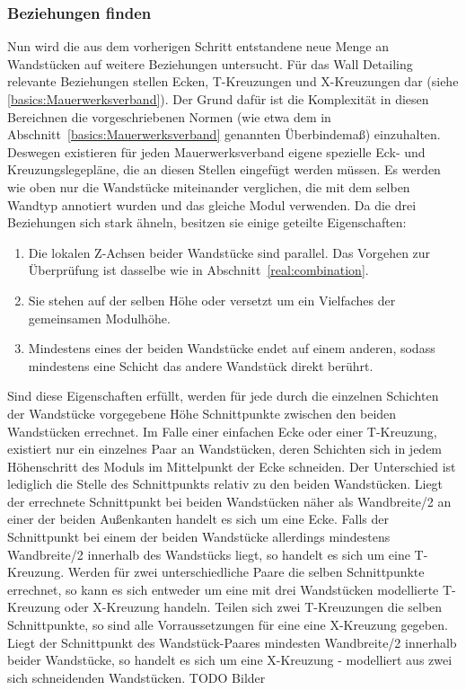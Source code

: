 \subsubsection{Beziehungen finden}
Nun wird die aus dem vorherigen Schritt entstandene neue Menge an Wandstücken auf weitere Beziehungen untersucht.
Für das Wall Detailing relevante Beziehungen stellen Ecken, T-Kreuzungen und X-Kreuzungen dar (siehe \ref{basics:Mauerwerksverband}).
Der Grund dafür ist die Komplexität in diesen Bereichnen die vorgeschriebenen Normen (wie etwa dem in Abschnitt~\ref{basics:Mauerwerksverband} genannten Überbindemaß) einzuhalten.
Deswegen existieren für jeden Mauerwerksverband eigene spezielle Eck- und Kreuzungslegepläne, die an diesen Stellen eingefügt werden müssen.
Es werden wie oben nur die Wandstücke miteinander verglichen, die mit dem selben Wandtyp annotiert wurden und das gleiche Modul verwenden.
Da die drei Beziehungen sich stark ähneln, besitzen sie einige geteilte Eigenschaften:
\begin{enumerate}
    \item Die lokalen Z-Achsen beider Wandstücke sind parallel. Das Vorgehen zur Überprüfung ist dasselbe wie in Abschnitt~\ref{real:combination}.
    \item Sie stehen auf der selben Höhe oder versetzt um ein Vielfaches der gemeinsamen Modulhöhe.
    \item Mindestens eines der beiden Wandstücke endet auf einem anderen, sodass mindestens eine Schicht das andere Wandstück direkt berührt.
\end{enumerate}
Sind diese Eigenschaften erfüllt, werden für jede durch die einzelnen Schichten der Wandstücke vorgegebene Höhe Schnittpunkte zwischen den beiden Wandstücken errechnet.
Im Falle einer einfachen Ecke oder einer T-Kreuzung, existiert nur ein einzelnes Paar an Wandstücken, deren Schichten sich in jedem Höhenschritt des Moduls im Mittelpunkt der Ecke schneiden.
Der Unterschied ist lediglich die Stelle des Schnittpunkts relativ zu den beiden Wandstücken.
Liegt der errechnete Schnittpunkt bei beiden Wandstücken näher als Wandbreite/2 an einer der beiden Außenkanten handelt es sich um eine Ecke.
Falls der Schnittpunkt bei einem der beiden Wandstücke allerdings mindestens Wandbreite/2 innerhalb des Wandstücks liegt, so handelt es sich um eine T-Kreuzung.
Werden für zwei unterschiedliche Paare die selben Schnittpunkte errechnet, so kann es sich entweder um eine mit drei Wandstücken modellierte T-Kreuzung oder X-Kreuzung handeln.
Teilen sich zwei T-Kreuzungen die selben Schnittpunkte, so sind alle Vorraussetzungen für eine eine X-Kreuzung gegeben.
Liegt der Schnittpunkt des Wandstück-Paares mindesten Wandbreite/2 innerhalb beider Wandstücke, so handelt es sich um eine X-Kreuzung - modelliert aus zwei sich schneidenden Wandstücken. 
TODO Bilder

